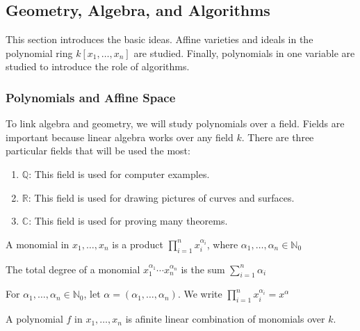 \documentclass[crop=false,class=article,oneside]{standalone}
\begin{document}
    \subsection{Geometry, Algebra, and Algorithms}
        This section introduces the basic ideas. Affine
        varieties and ideals in the polynomial ring
        $k[x_1,\hdots,x_n]$ are studied. Finally, polynomials
        in one variable are studied to introduce the role
        of algorithms.
        \subsubsection{Polynomials and Affine Space}
            To link algebra and geometry, we will study
            polynomials over a field. Fields are important
            because linear algebra works over any field $k$.
            There are three particular fields that will
            be used the most:
            \begin{enumerate}
                \item $\mathbb{Q}$: This field is used
                      for computer examples.
                \item $\mathbb{R}$: This field is used
                      for drawing pictures of curves and surfaces.
                \item $\mathbb{C}$: This field is used
                      for proving many theorems.
            \end{enumerate}
            \begin{definition}
                A monomial in $x_1,\hdots,x_n$ is a product
                $\prod_{i=1}^{n}x_{i}^{\alpha_{i}}$, where
                $\alpha_{1},\hdots,\alpha_{n}\in\mathbb{N}_0$
            \end{definition}
            \begin{definition}
                The total degree of a monomial
                $x_1^{\alpha_1}\cdots x_n^{\alpha_n}$ is
                the sum $\sum_{i=1}^{n}\alpha_{i}$
            \end{definition}
            \begin{notation}
                For $\alpha_1,\hdots,\alpha_n\in\mathbb{N}_0$,
                let $\alpha=(\alpha_1,\hdots,\alpha_n)$.
                We write
                $\prod_{i=1}^{n}x_{i}^{\alpha_{i}}=x^{\alpha}$
            \end{notation}
            \begin{definition}
                A polynomial $f$ in $x_1,\hdots, x_n$
                is afinite linear combination of
                monomials over $k$.
            \end{definition}
\end{document}
